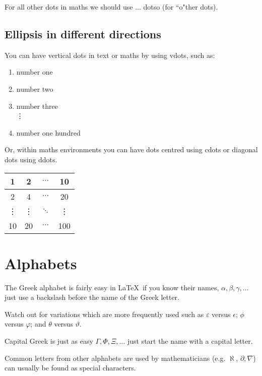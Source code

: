 \documentclass[a4paper,11pt]{article}
\begin{document}
For all other dots in maths we should use $\dotso$ dotso (for ``o"ther dots).

\subsection{Ellipsis in different directions}

You can have vertical dots in text or maths by using vdots, such as:
\begin{enumerate}
	\item number one
	\item number two
	\item number three\\
	\vdots                   %
	\setcounter{enumi}{99}
	\item number one hundred
\end{enumerate}

Or, within maths environments you can have dots centred using cdots or diagonal dots using ddots. 
\begin{tabular}{|c|c|c|c|}
	\hline 
	1 		& 2 		& $\cdots$ & 10 	\\ %
	\hline 
	2 		& 4 		& $\cdots$ & 20 	\\ 
	\hline 
	\vdots 	& \vdots 	& $\ddots$ & \vdots \\    
	\hline 
	10 		& 20 		& $\cdots$ & 100 	\\ 
	\hline 
\end{tabular} 

\pagebreak



\section{Alphabets}

The Greek alphabet is fairly easy in \LaTeX \, if you know their names,  $\alpha, \beta, \gamma, \dots$ just use a backslash before the name of the Greek letter. 

Watch out for variations which are more frequently used such as $\varepsilon$ versus $\epsilon$;  $\phi$ versus $\varphi$; and $\theta$ versus $\vartheta$.

Capital Greek is just as easy $\Gamma, \Phi, \Xi, \dots$ just start the name with a capital letter.

Common letters from other alphabets are used by mathematicians (e.g. $\aleph$, $\partial, \nabla$) can usually be found as special characters.
\end{document}
